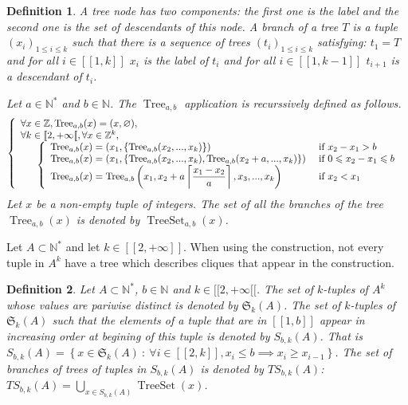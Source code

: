 \documentclass{article}
\newtheorem{definition}{Definition}[section]
\DeclareMathOperator{\tree}{Tree}
\DeclareMathOperator{\treeset}{TreeSet}
\newcommand{\TS}{\mathit{TS}}
\begin{document}
\begin{definition}
A tree node has two components: the first one is the label and the second one is the set of descendants of this node. A 
branch of a tree \(T\) is a tuple \((x_i)_{1 \leqslant i \leqslant k}\) such that there is a sequence of trees 
\((t_i)_{1 \leqslant i \leqslant k}\) satisfying: \(t_1 = T\) and for all \(i \in [\![1, k]\!]\) \(x_i\) is the label 
of \(t_i\) and for all \(i \in [\![1, k - 1]\!]\) \(t_{i + 1}\) is a descendant of \(t_i\).

Let \(a \in \mathbb{N}^*\) and \(b \in \mathbb{N}\). The \(\tree_{a, b}\) application is recurssively defined as 
follows.
\[ \left\{
\begin{array}{l}
	\forall x \in \mathbb{Z}, \tree_{a, b}(x) = (x, \varnothing), \\
	\forall k \in [\![2, +\infty[\![, \forall x \in \mathbb{Z}^k, \\
	\mspace{30mu}
		\left\{
		\begin{array}{l l}
			\tree_{a, b}(x) = (x_1, \{\tree_{a, b}(x_2, ..., x_k)\}) &  ~\text{if}~ x_2 - x_1 > b \\
			\tree_{a, b}(x) = (x_1, \{\tree_{a, b}(x_2, ..., x_k), \tree_{a, b}(x_2 + a, ..., x_k)\}) &  ~\text{if}~ 0 \leqslant 
				x_2 - x_1 \leqslant b \\
			\tree_{a, b}(x) = \tree_{a, b} \left(x_1, x_2 + a \left \lceil \dfrac{x_1 - x_2}{a} \right \rceil, x_3, ..., x_k 
				\right) & ~\text{if}~ x_2 < x_1
		\end{array}
		\right.
\end{array}
\right. \]
Let \(x\) be a non-empty tuple of integers. The set of all the branches of the tree \(\tree_{a, b}(x)\) is denoted by 
\(\treeset_{a, b}(x)\).
\end{definition}

Let \(A \subset \mathbb{N}^*\) and let \(k \in [\![2, +\infty]\!]\). When using the construction, not every tuple in 
\(A^k\) have a tree which describes cliques that appear in the construction.

\begin{definition}
Let \(A \subset \mathbb{N}^*\), \(b \in \mathbb{N}\) and \(k \in [\![2, +\infty[\![\). The set of \(k\)-tuples of 
\(A^k\) whose values are pariwise distinct is denoted by \(\mathfrak{S}_k(A)\). The set of \(k\)-tuples of 
\(\mathfrak{S}_k(A)\) such that the elements of a tuple that are in \([\![1, b]\!]\) appear in increasing order at 
begining of this tuple is denoted by \(S_{b,k}(A)\). That is 
\(S_{b,k}(A) = \left\{ x \in \mathfrak{S}_k(A) ~:~ \forall i \in  [\![2, k]\!], x_i \leqslant b \implies x_i \geqslant 
x_{i -1} \right\}\). The set of branches of trees of tuples in \(S_{b, k}(A)\) is denoted by \(\TS_{b,k}(A)\): 
\(\TS_{b,k}(A) = \displaystyle \bigcup \limits_{x \in S_{b,k}(A)} \treeset(x)\).
\end{definition}
\end{document}
